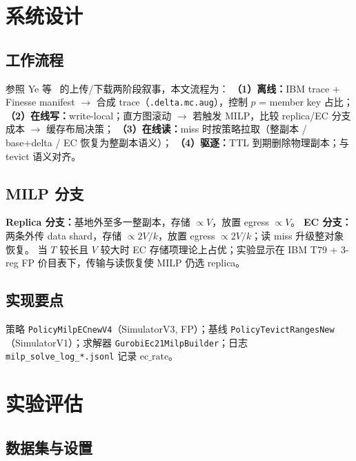 \documentclass[conference]{IEEEtran}
\begin{document}
\section{系统设计}
\label{sec:design}

\subsection{工作流程}

参照 Ye 等~\cite{ye2021fast} 的上传/下载两阶段叙事，本文流程为：
\textbf{（1）离线：}IBM trace + Finesse manifest $\rightarrow$ 合成 trace（\texttt{.delta.mc.aug}），控制 $p$ = member key 占比；
\textbf{（2）在线写：}write-local；直方图滚动 $\rightarrow$ 若触发 MILP，比较 replica/EC 分支成本 $\rightarrow$ 缓存布局决策；
\textbf{（3）在线读：}miss 时按策略拉取（整副本 / base+delta / EC 恢复为整副本语义）；
\textbf{（4）驱逐：}TTL 到期删除物理副本；与 tevict 语义对齐。

\subsection{MILP 分支}

\textbf{Replica 分支：}基地外至多一整副本，存储 $\propto V$，放置 egress $\propto V$。
\textbf{EC 分支：}两条外传 data shard，存储 $\propto 2V/k$，放置 egress $\propto 2V/k$；读 miss 升级整对象恢复。
当 $T$ 较长且 $V$ 较大时 EC 存储项理论上占优；实验显示在 IBM T79 + 3-reg FP 价目表下，传输与读恢复使 MILP 仍选 replica。

\subsection{实现要点}

策略 \texttt{PolicyMilpECnewV4}（SimulatorV3, FP）；基线 \texttt{PolicyTevictRangesNew}（SimulatorV1）；求解器 \texttt{GurobiEc21MilpBuilder}；日志 \texttt{milp\_solve\_log\_*.jsonl} 记录 $\mathrm{ec\_rate}$。

\section{实验评估}
\label{sec:eval}

\subsection{数据集与设置}
\end{document}
